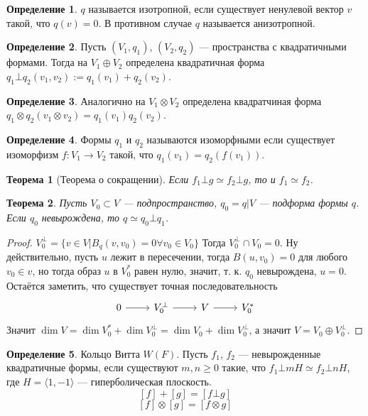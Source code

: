 \documentclass{article}
\newtheorem*{theorem}{Теорема}
\theoremstyle{definition}
\newtheorem*{definition}{Определение}
\theoremstyle{remark}
\begin{document}
\begin{definition}
    $q$ называется изотропной, если существует ненулевой вектор $v$ такой, что $q(v) = 0$. В противном случае $q$ называется анизотропной.
\end{definition}

\begin{definition}
    Пусть $(V_1, q_1)$, $(V_2, q_2)$ --- пространства с квадратичными формами. Тогда на $V_1 \oplus V_2$ определена квадратичная форма $q_1 \bot q_2(v_1, v_2) := q_1(v_1) + q_2(v_2)$.
\end{definition}

\begin{definition}
    Аналогично на $V_1 \otimes V_2$ определена квадратчиная форма $q_1 \otimes q_2(v_1 \otimes v_2) = q_1(v_1) q_2(v_2)$.
\end{definition}

\begin{definition}
    Формы $q_1$ и $q_2$ называются изоморфными если существует изоморфизм $f: V_1 \rightarrow V_2$ такой, что $q_1(v_1) = q_2(f(v_1))$.
\end{definition}

\begin{theorem}[Теорема о сокращении]
    Если $f_1 \bot g \simeq f_2 \bot g$, то и $f_1 \simeq f_2$.
\end{theorem}

\begin{theorem}
    Пусть $V_0 \subset V$ --- подпространство, $q_0 = q|V$ --- подформа формы $q$. Если $q_0$ невырождена, то $q \simeq q_0 \bot q_1$.
\end{theorem}
\begin{proof}
    $V_0^\bot = \{v \in V | B_q(v, v_0) = 0 \forall v_0 \in V_0\}$
    Тогда $V_0^\bot \cap V_0 = 0$. Ну действительно, пусть $u$ лежит в пересечении, тогда $B(u, v_0) = 0$ для любого $v_0 \in v$, но тогда образ $u$ в $V_0^*$ равен нулю, значит, т. к. $q_0$ невырождена, $u = 0$.
    Остаётся заметить, что существует точная последовательность
    \begin{equation*}
    \begin{tikzcd}
    0 \rar & V_0^\bot \rar & V \rar & V_0^*
    \end{tikzcd}
    \end{equation*}
    Значит $\dim V = \dim V_0^* + \dim V_0^\bot = \dim V_0 + \dim V_0^\bot$, а значит $V = V_0 \oplus V_0^\bot$.
\end{proof}

\begin{definition}
    Кольцо Витта $W(F)$. Пусть $f_1$, $f_2$ --- невырожденные квадратичные формы, если существуют $m, n \geq 0$ такие, что $f_1 \bot mH \simeq f_2 \bot nH$, где $H = \langle 1, -1 \rangle$ --- гиперболическая плоскость.
    $$[f] + [g] = [f \bot g]$$
    $$[f] \otimes [g] = [f \otimes g]$$
\end{definition}
\end{document}

